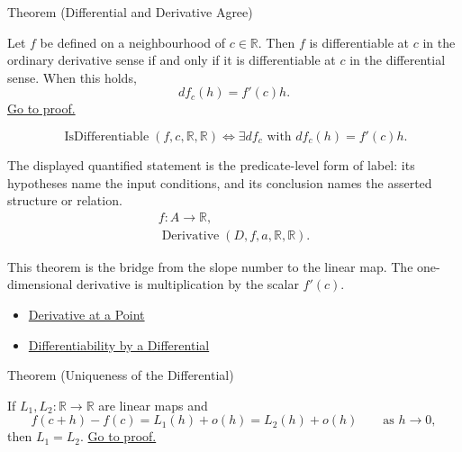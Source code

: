 \begin{theorembox}{Theorem (Differential and Derivative Agree)}
\begin{theorem}
\label{thm:differential-and-derivative-agree}
Let $f$ be defined on a neighbourhood of $c\in\mathbb{R}$. Then $f$ is differentiable at $c$ in the ordinary derivative sense if and only if it is differentiable at $c$ in the differential sense. When this holds,
\[
  df_c(h)=f'(c)h.
\]
\hyperref[prf:differential-and-derivative-agree]{Go to proof.}
\end{theorem}
\end{theorembox}

\begin{remark*}
\[
  \operatorname{IsDifferentiable}(f,c,\mathbb{R},\mathbb{R})
  \Longleftrightarrow
  \exists df_c\text{ with }df_c(h)=f'(c)h.
\]
\end{remark*}

\begin{remark*}
The displayed quantified statement is the predicate-level form of label: its hypotheses name the input conditions, and its conclusion names the asserted structure or relation.
\[
\begin{aligned}
  f\colon A\to\mathbb{R},\\
  \operatorname{Derivative}(D,f,a,\mathbb{R},\mathbb{R}).
\end{aligned}
\]
\end{remark*}

\begin{remark*}[Interpretation]
This theorem is the bridge from the slope number to the linear map. The one-dimensional derivative is multiplication by the scalar $f'(c)$.
\end{remark*}

\begin{dependencies}
\begin{itemize}
  \item \hyperref[def:derivative-at-a-point]{Derivative at a Point}
  \item \hyperref[def:differentiability-by-a-differential]{Differentiability by a Differential}
\end{itemize}
\end{dependencies}

\begin{theorembox}{Theorem (Uniqueness of the Differential)}
\begin{theorem}
\label{thm:uniqueness-of-the-differential}
If $L_1,L_2:\mathbb{R}\to\mathbb{R}$ are linear maps and
\[
  f(c+h)-f(c)=L_1(h)+o(h)=L_2(h)+o(h)
  \qquad\text{as } h\to 0,
\]
then $L_1=L_2$.
\hyperref[prf:uniqueness-of-the-differential]{Go to proof.}
\end{theorem}
\end{theorembox}

